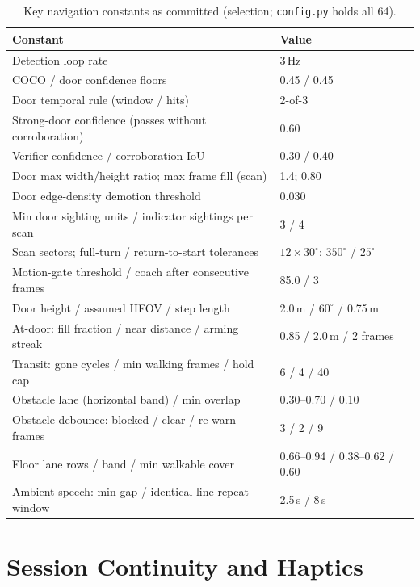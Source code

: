 \begin{table}[!htbp]
\centering
\caption[Key navigation constants]{Key navigation constants as committed
(selection; \texttt{config.py} holds all 64).}
\label{tab:nav_constants}
\small
\begin{tabular}{p{8.2cm} l}
\toprule
\textbf{Constant} & \textbf{Value} \\
\midrule
Detection loop rate & 3\,Hz \\
COCO / door confidence floors & 0.45 / 0.45 \\
Door temporal rule (window / hits) & 2-of-3 \\
Strong-door confidence (passes without corroboration) & 0.60 \\
Verifier confidence / corroboration IoU & 0.30 / 0.40 \\
Door max width/height ratio; max frame fill (scan) & 1.4; 0.80 \\
Door edge-density demotion threshold & 0.030 \\
Min door sighting units / indicator sightings per scan & 3 / 4 \\
Scan sectors; full-turn / return-to-start tolerances & $12\times30^\circ$; $350^\circ$ / $25^\circ$ \\
Motion-gate threshold / coach after consecutive frames & 85.0 / 3 \\
Door height / assumed HFOV / step length & 2.0\,m / $60^\circ$ / 0.75\,m \\
At-door: fill fraction / near distance / arming streak & 0.85 / 2.0\,m / 2 frames \\
Transit: gone cycles / min walking frames / hold cap & 6 / 4 / 40 \\
Obstacle lane (horizontal band) / min overlap & 0.30--0.70 / 0.10 \\
Obstacle debounce: blocked / clear / re-warn frames & 3 / 2 / 9 \\
Floor lane rows / band / min walkable cover & 0.66--0.94 / 0.38--0.62 / 0.60 \\
Ambient speech: min gap / identical-line repeat window & 2.5\,s / 8\,s \\
\bottomrule
\end{tabular}
\end{table}

\section{Session Continuity and Haptics}
\label{sec:continuity}

